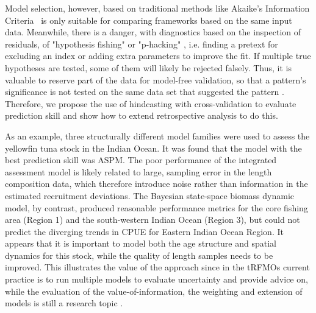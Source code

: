\documentclass[12pt,halfline,a4paper,nonumbib]{ouparticle}
\begin{document}
Model selection, however, based on traditional methods like Akaike’s Information Criteria  \parencite[AIC,][]{akaike1998information} is only suitable for comparing frameworks based on the same input data. Meanwhile, there is a danger, with diagnostics based on the inspection of residuals, of "hypothesis fishing" or "p-hacking" \parencite{wasserstein2016asa,head2015extent}, i.e. finding a pretext for excluding an index or adding extra parameters \parencite[e.g.][]{schirripa2017hypothesis} to improve the fit. If multiple true hypotheses are tested, some of them will likely be rejected falsely. Thus, it is valuable to reserve part of the data for model-free validation, so that a pattern’s significance is not tested on the same data set that suggested the pattern \parencite{arlot2010survey}. Therefore, we propose the use of hindcasting with cross-validation to evaluate prediction skill and show how to extend retrospective analysis to do this.

As an example, three structurally different model families were used to assess the yellowfin tuna stock in the Indian Ocean. It was found that the model with the best prediction skill was ASPM. The poor performance of the integrated assessment model is likely related to large, sampling error in the length composition data, which therefore introduce noise rather than information in the estimated recruitment deviations. The Bayesian state-space biomass dynamic model, by contrast, produced reasonable performance metrics for the core fishing area (Region 1) and the south-western Indian Ocean (Region 3), but could not predict the diverging trends in CPUE for Eastern Indian Ocean Region. It appears that it is important to model both the age structure and spatial dynamics for this stock, while the quality of length samples needs to be improved. This illustrates the value of the approach since in the tRFMOs current practice is to run multiple models to evaluate uncertainty and provide advice on, while the evaluation of the value-of-information, the weighting and extension of models is still a research topic \cite{kell2016quantification}. 
\end{document}
